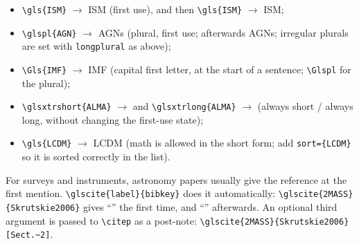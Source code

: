 %
\begin{itemize}
  \item \verb|\gls{ISM}| $\to$ \gls{ISM} (first use), and then \verb|\gls{ISM}| $\to$ \gls{ISM};
  \item \verb|\glspl{AGN}| $\to$ \glspl{AGN} (plural, first use; afterwards \glspl{AGN}; irregular plurals are set with \texttt{longplural} as above);
  \item \verb|\Gls{IMF}| $\to$ \Gls{IMF} (capital first letter, at the start of a sentence; \verb|\Glspl| for the plural);
  \item \verb|\glsxtrshort{ALMA}| $\to$  and \verb|\glsxtrlong{ALMA}| $\to$  (always short / always long, without changing the first-use state);
  \item \verb|\gls{LCDM}| $\to$ \gls{LCDM} (math is allowed in the short form; add \texttt{sort=\{LCDM\}} so it is sorted correctly in the list).
\end{itemize}

For surveys and instruments, astronomy papers usually give the reference at the first mention. \verb|\glscite{label}{bibkey}| does it automatically: \verb|\glscite{2MASS}{Skrutskie2006}| gives ``'' the first time, and ``'' afterwards. An optional third argument is passed to \verb|\citep| as a post-note: \verb|\glscite{2MASS}{Skrutskie2006}[Sect.~2]|.

